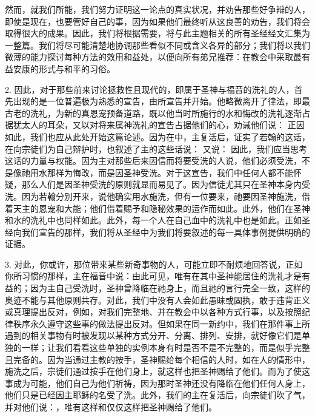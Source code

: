 然而，就我们所能，我们努力证明这一论点的真实状况，并劝告那些好争辩的人，即使是现在，也要管好自己的事，因为如果他们最终听从这良善的劝告，我们将会取得很大的成果。因此，我们将根据需要，将与此主题相关的所有圣经经文汇集为一整篇。我们将尽可能清楚地协调那些看似不同或含义各异的部分；我们将以我们微薄的能力探讨每种方法的效用和益处，以便向所有弟兄推荐：在教会中采取最有益安康的形式与和平的习俗。\par

2. 因此，对于那些前来讨论拯救性且现代的，即属于圣神与福音的洗礼的人，首先出现的是一位普遍极为熟悉的宣告，由所宣告并开始。他略微离开了律法，即最古老的洗礼，为新的真恩宠预备道路，既以他当时所施行的水和悔改的洗礼逐渐占据犹太人的耳朵，又以对将来属神洗礼的宣告占据他们的心，劝诫他们说： 正因如此，我们也应从此处开始这篇论述。因为在中，主复活后，证实了若翰的这话， 在向宗徒们为自己辩护时，也叙述了主的这些话说： 又说： 因此，我们应当思考这话的力量与权能。因为主对那些后来因信而将要受洗的人说，他们必须受洗，不是像祂用水那样为悔改，而是因圣神受洗。对于这宣告，我们中任何人都不能怀疑，那么人们是因圣神受洗的原则就显而易见了。因为信徒尤其只在圣神本身内受洗。因为若翰分别开来，说他确实用水施洗，但有一位要来，祂要因圣神施洗，借着天主的恩宠和大能；他们借着赐予和隐秘效果的运作而如此。此外，他们在圣神和水的洗礼中也同样如此。此外，每一个人在自己血中的洗礼中也是如此。正如圣经向我们宣告的那样，我们将从圣经中为我们将要叙述的每一具体事例提供明确的证据。\par

3. 对此，你或许，那位带来某些新奇事物的人，可能立即不耐烦地回答说，正如你所习惯的那样，主在福音中说：由此可见，唯有在其中圣神能居住的洗礼才是有益的；因为主自己受洗时，圣神曾降临在祂身上，而且祂的言行完全一致，这样的奥迹不能与其他原则共存。对此，我们中没有人会如此愚昧或固执，敢于违背正义或真理提出反对，例如，对我们完整地、并在教会中以各种方式行事，以及按照纪律秩序永久遵守这些事的做法提出反对。但如果在同一新约中，我们在那件事上所遇到的相关事物有时被发现以某种方式分开、分离、排列、安排，就好像它们是单独的一样；让我们看看这些单独的实例本身有时是否不是不完整的，而是似乎完整且完备的。因为当通过主教的按手，圣神赐给每个相信的人时，如在人的情形中，施洗之后，宗徒们通过按手在他们身上，就这样也把圣神赐给了他们。而为了使这事成为可能，他们自己为他们祈祷，因为那时圣神还没有降临在他们任何人身上，他们只是已经因主耶稣的名受了洗。此外，我们的主在复活后，向宗徒们吹了气，并对他们说：，唯有这样和仅仅这样把圣神赐给了他们。\par

